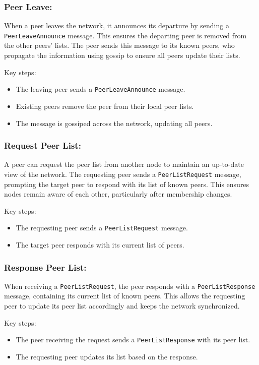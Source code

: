 \subsubsection{Peer Leave:}
When a peer leaves the network, it announces its departure by sending a \texttt{PeerLeaveAnnounce} message. This ensures the departing peer is removed from the other peers' lists. The peer sends this message to its known peers, who propagate the information using gossip to ensure all peers update their lists.

Key steps:
\begin{itemize}
    \item The leaving peer sends a \texttt{PeerLeaveAnnounce} message.
    \item Existing peers remove the peer from their local peer lists.
    \item The message is gossiped across the network, updating all peers.
\end{itemize}

\subsubsection{Request Peer List:}
A peer can request the peer list from another node to maintain an up-to-date view of the network. The requesting peer sends a \texttt{PeerListRequest} message, prompting the target peer to respond with its list of known peers. This ensures nodes remain aware of each other, particularly after membership changes.

Key steps:
\begin{itemize}
    \item The requesting peer sends a \texttt{PeerListRequest} message.
    \item The target peer responds with its current list of peers.
\end{itemize}

\subsubsection{Response Peer List:}
When receiving a \texttt{PeerListRequest}, the peer responds with a \texttt{PeerListResponse} message, containing its current list of known peers. This allows the requesting peer to update its peer list accordingly and keeps the network synchronized.

Key steps:
\begin{itemize}
    \item The peer receiving the request sends a \texttt{PeerListResponse} with its peer list.
    \item The requesting peer updates its list based on the response.
\end{itemize}



